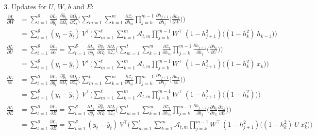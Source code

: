 \documentclass{article}
\begin{document}
3. Updates for $U$, $W$, $b$ and $E$:
\begin{align*}
   \frac{\partial L}{ \partial{W}} &=
\sum_{t=1}^{\mathcal{S}}
\frac{\partial L_t}{\partial \hat{y}_t}~\frac{\partial \hat{y}_t}{\partial \Omega_t}~\frac{\partial \Omega_t}{ \partial \mathcal{Z}_t} \biggl( 
\sum_{m=1}^{t}
\sum_{k=1}^{m} \frac{\partial \mathcal{Z}_t}{ \partial h_m} 
\prod_{j=k}^{m-1} \frac{\partial h_{j+1}}{ \partial h_j} 
\biggl( \frac{\partial h_k}{ \partial W} \biggl) \biggl) \\
  &=
\sum_{t=1}^{\mathcal{S}}
(y_t - \hat{y}_t)~V^\top \biggl( 
\sum_{m=1}^{t}
\sum_{k=1}^{m} \mathcal{A}_{t,m} 
\prod_{j=k}^{m-1} W^\top ~ (1 - h_{j+1}^2)
\biggl( (1-h_k^2)~ h_{k-1} \biggl) \biggl) \\
     \frac{\partial L}{ \partial{U}} &= \sum_{t=1}^{\mathcal{S}} \frac{\partial L_t}{ \partial{U}} =
\sum_{t=1}^{\mathcal{S}}
\frac{\partial L_t}{\partial \hat{y}_t}~\frac{\partial \hat{y}_t}{\partial \Omega_t}~\frac{\partial \Omega_t}{ \partial \mathcal{Z}_t} \biggl( 
\sum_{m=1}^{t}
\sum_{k=1}^{m} \frac{\partial \mathcal{Z}_t}{ \partial h_m} 
\prod_{j=k}^{m-1} \frac{\partial h_{j+1}}{ \partial h_j} 
\biggl( \frac{\partial h_k}{ \partial U} \biggl) \biggl) \\
  &=
\sum_{t=1}^{\mathcal{S}}
(y_t - \hat{y}_t)~V^\top \biggl( 
\sum_{m=1}^{t}
\sum_{k=1}^{m} \mathcal{A}_{t,m} 
\prod_{j=k}^{m-1} W^\top ~ (1 - h_{j+1}^2)
\biggl( (1-h_k^2)~ x_{k} \biggl) \biggl) \\
     \frac{\partial L}{ \partial{b}} &=
\sum_{t=1}^{\mathcal{S}}
\frac{\partial L_t}{\partial \hat{y}_t}~\frac{\partial \hat{y}_t}{\partial \Omega_t}~\frac{\partial \Omega_t}{ \partial \mathcal{Z}_t} \biggl( 
\sum_{m=1}^{t}
\sum_{k=1}^{m} \frac{\partial \mathcal{Z}_t}{ \partial h_m} 
\prod_{j=k}^{m-1} \frac{\partial h_{j+1}}{ \partial h_j} 
\biggl( \frac{\partial h_k}{ \partial b} \biggl) \biggl) \\
  &= 
\sum_{t=1}^{\mathcal{S}}
(y_t - \hat{y}_t)~V^\top \biggl( 
\sum_{m=1}^{t}
\sum_{k=1}^{m} \mathcal{A}_{t,m} 
\prod_{j=k}^{m-1} W^\top ~ (1 - h_{j+1}^2)
\biggl( (1-h_k^2) \biggl) \biggl) \\
\frac{\partial L}{ \partial{E}} &= \sum_{t=1}^{\mathcal{S}} \frac{\partial L_t}{ \partial{E}} =
\sum_{t=1}^{\mathcal{S}}
\frac{\partial L_t}{\partial \hat{y}_t}~\frac{\partial \hat{y}_t}{\partial \Omega_t}~\frac{\partial \Omega_t}{ \partial \mathcal{Z}_t} \biggl( 
\sum_{m=1}^{t}
\sum_{k=1}^{m} \frac{\partial \mathcal{Z}_t}{ \partial h_m} 
\prod_{j=k}^{m-1} \frac{\partial h_{j+1}}{ \partial h_j} 
\biggl( \frac{\partial h_k}{ \partial x_k}\frac{\partial x_k}{ \partial E} \biggl) \biggl) \\
&= \sum_{t=1}^{\mathcal{S}} \frac{\partial L_t}{ \partial{E}} =
\sum_{t=1}^{\mathcal{S}}
(y_t - \hat{y}_t)~V^\top \biggl( 
\sum_{m=1}^{t}
\sum_{k=1}^{m} \mathcal{A}_{t,m} 
\prod_{j=k}^{m-1} W^\top ~ (1 - h_{j+1}^2)
\biggl( (1-h_k^2)~ U~ x^o_k \biggl) \biggl)
\end{align*}    
\end{document}
